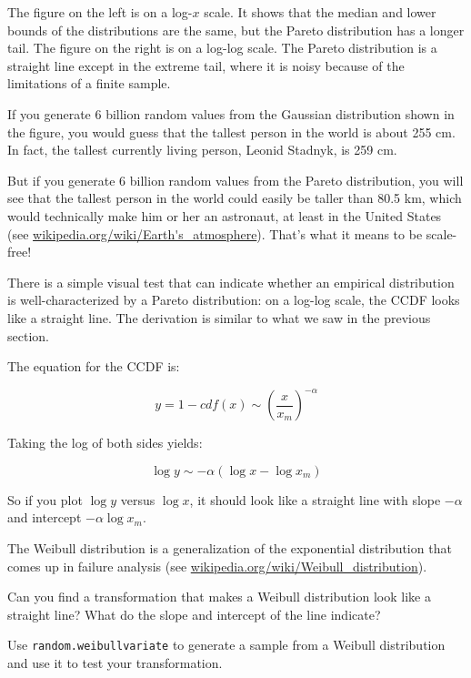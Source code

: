 \documentclass[10pt]{book}
\begin{document}
The figure on the left is on a log-$x$ scale.  It shows that the
median and lower bounds of the distributions are the same, but
the Pareto distribution has a longer tail.  The figure on the
right is on a log-log scale.  The Pareto distribution is a straight
line except in the extreme tail, where it is noisy because of
the limitations of a finite sample.

If you generate 6 billion random values from the Gaussian distribution
shown in the figure, you would guess that the tallest person in the
world is about 255 cm.  In fact, the tallest currently living person,
Leonid Stadnyk, is 259 cm.

But if you generate 6 billion random values from the Pareto
distribution, you will see that the tallest person in the world could
easily be taller than 80.5 km, which would technically make him or her
an astronaut, at least in the United States (see
\url{wikipedia.org/wiki/Earth's_atmosphere}).  That's what it means to
be scale-free!

There is a simple visual test that can indicate whether an empirical
distribution is well-characterized by a Pareto distribution: on a
log-log scale, the CCDF looks like a straight line.  The derivation is
similar to what we saw in the previous section.

The equation for the CCDF is:

\[ y = 1 - cdf(x) \sim \left( \frac{x}{x_m} \right) ^{-\alpha} \]

Taking the log of both sides yields:

\[ \log y \sim -\alpha (\log x - \log x_m ) \]

So if you plot $\log y$ versus $\log x$, it should look like a
straight line with slope $-\alpha$ and intercept $-\alpha \log x_m$.

\begin{ex}

The Weibull distribution is a generalization of the exponential
distribution that comes up in failure analysis
(see \url{wikipedia.org/wiki/Weibull_distribution}).

Can you find a transformation that makes a Weibull distribution look
like a straight line?  What do the slope and intercept of the
line indicate?

Use {\tt random.weibullvariate} to generate a sample from a
Weibull distribution and use it to test your transformation.

\end{ex}
\end{document}
